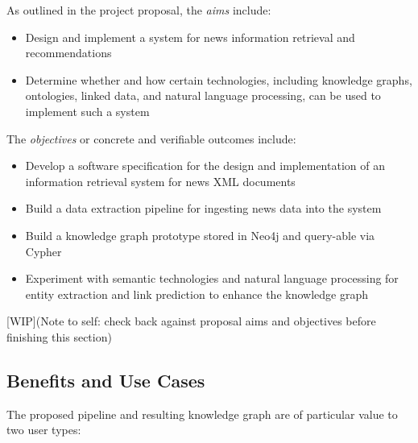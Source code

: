 \documentclass[11pt]{article}
\begin{document}
As outlined in the project proposal\cite{ek-proposal}, the \textit{aims} include:
\begin{itemize}
  \item Design and implement a system for news information retrieval and recommendations
  \item Determine whether and how certain technologies, including knowledge graphs, ontologies, linked data, and natural language processing, can be used to implement such a system
\end{itemize}

The \textit{objectives} or concrete and verifiable outcomes include:
\begin{itemize}
  \item Develop a software specification for the design and implementation of an information retrieval system for news XML documents
  \item Build a data extraction pipeline for ingesting news data into the system
  \item Build a knowledge graph prototype stored in Neo4j and query-able via Cypher
  \item Experiment with semantic technologies and natural language processing for entity extraction and link prediction to enhance the knowledge graph
\end{itemize}

[WIP](Note to self: check back against proposal aims and objectives before finishing this section)

\subsection{Benefits and Use Cases}
The proposed pipeline and resulting knowledge graph are of particular value to two user types:
\end{document}
